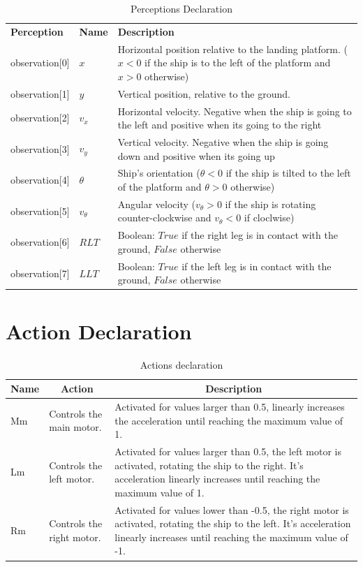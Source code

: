 \documentclass[a4paper, 12pt, fleqn]{report}
\begin{document}
\begin{table}[h!]
\centering
\begin{tabular}{p{3cm} p{3cm} p{10cm}}
\textbf{Perception} & \textbf{Name} & \textbf{Description} \\[15pt]
observation[0] & $x$ & Horizontal position relative to the landing platform. ($x < 0$ if the ship is to the left of the platform and $x > 0$ otherwise)\\[10pt]
observation[1] & $y$ & Vertical position, relative to the ground. \\[10pt]
observation[2] & $v_x$ & Horizontal velocity. Negative when the ship is going to the left and positive when its going to the right\\[10pt]
observation[3] & $v_y$ & Vertical velocity. Negative when the ship is going down and positive when its going up \\[10pt]
observation[4] & $\theta$ & Ship's orientation ($\theta < 0$ if the ship is tilted to the left of the platform and $\theta > 0$ otherwise) \\[10pt]
observation[5] & $v_\theta$ & Angular velocity ($v_\theta > 0$ if the ship is rotating counter-clockwise and $v_\theta < 0$ if cloclwise)\\[10pt]
observation[6] & $RLT$ & Boolean: $True$ if the right leg is in contact with the ground, $False$ otherwise \\[10pt]
observation[7] & $LLT$ & Boolean: $True$ if the left leg is in contact with the ground, $False$ otherwise \\[10pt]
\end{tabular}
\caption{Perceptions Declaration}
\label{tab:perceptions}
\end{table} 



\section*{\fontsize{16}{20}\selectfont Action Declaration}


\begin{table}[h!]
\centering
\begin{tabular}{|p{1cm}|p{4cm}|p{11cm}|}
\hline
\multicolumn{1}{|c|}{\textbf{Name}} & \multicolumn{1}{c|}{\textbf{Action}} & \multicolumn{1}{c|}{\textbf{Description}} \\ \hline
Mm & Controls the main motor. & Activated for values larger than 0.5, linearly increases the acceleration until reaching the maximum value of 1. \\ \hline
Lm & Controls the left motor. & Activated for values larger than 0.5, the left motor is activated, rotating the ship to the right. It's acceleration linearly increases until reaching the maximum value of 1.\\ \hline
Rm & Controls the right motor. & Activated for values lower than -0.5, the right motor is activated, rotating the ship to the left. It's acceleration linearly increases until reaching the maximum value of -1. \\ \hline
\end{tabular}
\caption{Actions declaration}
\label{tab:actions}
\end{table}
\end{document}
